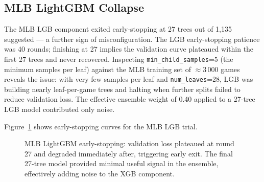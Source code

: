 \documentclass[conference]{IEEEtran}
\begin{document}
\subsection{MLB LightGBM Collapse}

The MLB LGB component exited early-stopping at 27 trees out of
1,135 suggested — a further sign of misconfiguration.  The LGB
early-stopping patience was 40 rounds; finishing at 27 implies the
validation curve plateaued within the first 27 trees and never
recovered.  Inspecting \texttt{min\_child\_samples}=5 (the minimum
samples per leaf) against the MLB training set of $\approx$3\,000
games reveals the issue: with very few samples per leaf and
\texttt{num\_leaves}=28, LGB was building nearly leaf-per-game
trees and halting when further splits failed to reduce validation
loss.  The effective ensemble weight of 0.40 applied to a 27-tree LGB
model contributed only noise.

Figure~\ref{fig:lgb_collapse} shows early-stopping curves for the
MLB LGB trial.

\begin{figure}[t]
\centering
{}
\caption{MLB LightGBM early-stopping: validation loss plateaued at
round 27 and degraded immediately after, triggering early exit.  The
final 27-tree model provided minimal useful signal in the ensemble,
effectively adding noise to the XGB component.}
\label{fig:lgb_collapse}
\end{figure}
\end{document}
